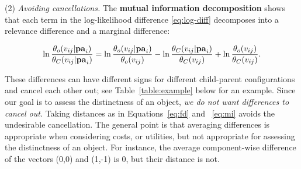 {\noindent
(2) {\em Avoiding cancellations.} The \textbf{mutual information decomposition} shows that each term in the log-likelihood difference \eqref{eq:log-diff} decomposes into a relevance difference and a marginal difference: 

\begin{equation} \label{eq:decompose}
\ln \frac{\theta_{o}( v_{ij}|\mathbf{pa}_{i})}{\theta_{C}( v_{ij}|\mathbf{pa}_{i})} = \ln \frac{\theta_{o}(v_{ij}|\mathbf{pa}_{i})}{\theta_{o}(v_{ij})} - \ln \frac{\theta_{C}( v_{ij}|\mathbf{pa}_{i})}{\theta_{C}(v_{ij})} + \ln \frac{\theta_{o}( v_{ij})}{\theta_{C}( v_{ij})}.
\end{equation}

These differences can have different signs for different child-parent configurations and cancel each other out; see Table~\ref{table:example} below for an example.  Since our goal is to assess the distinctness of an object, {\em we do not want differences to cancel out.} Taking distances as in Equations~\eqref{eq:fd} and ~\eqref{eq:mi} avoids the undesirable cancellation. The general point is that averaging differences is appropriate when considering costs, or utilities, but not appropriate for assessing the distinctness of an object. For instance, the average component-wise difference of the vectors (0,0) and (1,-1) is 0, but their distance is not.


}
